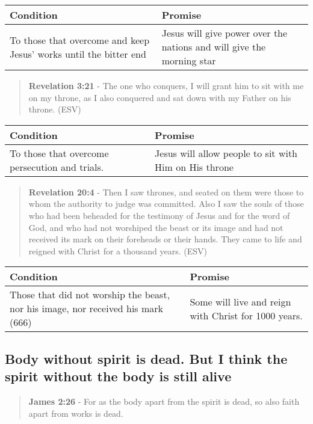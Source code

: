 \documentclass[11pt]{article}
\begin{document}
\begin{center}
\begin{tabular}{ll}
Condition & Promise\\[0pt]
\hline
To those that overcome and keep Jesus' works until the bitter end & Jesus will give power over the nations and will give the morning star\\[0pt]
\end{tabular}
\end{center}

\begin{quote}
\textbf{Revelation 3:21} - The one who conquers, I will grant him to sit with me on my throne, as I also conquered and sat down with my Father on his throne. (ESV)
\end{quote}

\begin{center}
\begin{tabular}{ll}
Condition & Promise\\[0pt]
\hline
To those that overcome persecution and trials. & Jesus will allow people to sit with Him on His throne\\[0pt]
\end{tabular}
\end{center}

\begin{quote}
\textbf{Revelation 20:4} - Then I saw thrones, and seated on them were those to whom the authority to judge was committed. Also I saw the souls of those who had been beheaded for the testimony of Jesus and for the word of God, and who had not worshiped the beast or its image and had not received its mark on their foreheads or their hands. They came to life and reigned with Christ for a thousand years. (ESV)
\end{quote}

\begin{center}
\begin{tabular}{ll}
Condition & Promise\\[0pt]
\hline
Those that did not worship the beast, nor his image, nor received his mark (666) & Some will live and reign with Christ for 1000 years.\\[0pt]
\end{tabular}
\end{center}

\subsection{Body without spirit is dead. But I think the spirit without the body is still alive}
\label{sec:org1064e66}
\begin{quote}
\textbf{James 2:26} - For as the body apart from the spirit is dead, so also faith apart from works is dead.
\end{quote}
\end{document}
